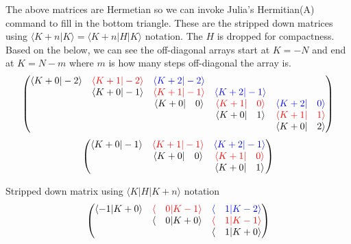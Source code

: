 \documentclass{article}
\begin{document}
The above matrices are Hermetian so we can invoke Julia's Hermitian(A) command to fill in the bottom triangle. These are the stripped down matrices using $\langle K+n|K\rangle=\langle K+n|H|K\rangle$ notation. The $H$ is dropped for compactness. Based on the below, we can see the off-diagonal arrays start at $K=-N$ and  end at $K=N-m$ where $m$ is how many steps off-diagonal the array is.
\begin{equation*}
\begin{pmatrix}
\langle K+0|-2\rangle & \color{red}\langle K+1|-2\rangle & \color{blue}\langle K+2|-2\rangle & & \\
& \color{black}\langle K+0|-1\rangle & \color{red}\langle K+1|-1\rangle & \color{blue}\langle K+2|-1\rangle & \\
& & \color{black}\langle K+0|\quad0\rangle & \color{red}\langle K+1|\quad0\rangle & \color{blue}\langle K+2|\quad0\rangle \\
& & & \color{black}\langle K+0|\quad1\rangle & \color{red}\langle K+1|\quad1\rangle \\
& & & & \color{black}\langle K+0|\quad2\rangle \\
\end{pmatrix}
\end{equation*}
\begin{equation*}
\begin{pmatrix}
\color{black}\langle K+0|-1\rangle & \color{red}\langle K+1|-1\rangle & \color{blue}\langle K+2|-1\rangle \\
 & \color{black}\langle K+0|\quad0\rangle & \color{red}\langle K+1|\quad0\rangle \\
 & & \color{black}\langle K+0|\quad1\rangle 
\end{pmatrix}
\end{equation*}

Stripped down matrix using $\langle K|H|K+n\rangle$ notation
\begin{equation*}
\begin{pmatrix}
\langle-1|K+0\rangle & \color{red}\langle\quad0|K-1\rangle & \color{blue}\langle\quad1|K-2\rangle \\
 & \color{black}\langle\quad0|K+0\rangle & \color{red}\langle\quad1|K-1\rangle \\
 & & \color{black}\langle\quad1|K+0\rangle 
\end{pmatrix}
\end{equation*}
\end{document}
